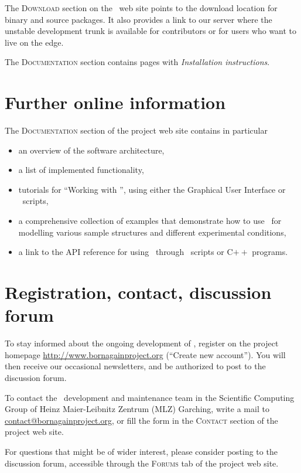The \textsc{Download} section on the \BornAgain\ web site
points to the download location for
binary and source packages.
It also provides a link to our  server
where the unstable development trunk is available
for contributors or for users who want to live on the edge.

The \textsc{Documentation} section contains
pages with \textit{Installation instructions}.


\section{Further online information}

The \textsc{Documentation} section of the project web site
contains in particular
\begin{itemize}
\item an overview of the software architecture,
\item a list of implemented functionality,
\item tutorials for ``Working with \BornAgain'',
      using either the Graphical User Interface or
      \Python\ scripts,
\item a comprehensive collection of examples that demonstrate
   how to use \BornAgain\ for modelling various sample structures
    and different experimental conditions,
\item a link to the API reference for using \BornAgain\ through
   \Python\ scripts or C$++$ programs.
%
%
%
\end{itemize}


\section{Registration, contact, discussion forum}

To stay informed about the ongoing development of \BornAgain,
register on the project homepage \url{http://www.bornagainproject.org}
(``Create new account'').
You will then receive our occasional newsletters,
and be authorized to post to the discussion forum.

To contact the \BornAgain\ development and maintenance team
in the Scientific Computing Group
of Heinz Maier-Leibnitz Zentrum (MLZ) Garching,
write a mail to \url{contact@bornagainproject.org},
or fill the form in the \textsc{Contact} section of the
project web site.

For questions that might be of wider interest,
please consider posting to the discussion forum,
accessible through the \textsc{Forums} tab of the project web site.
